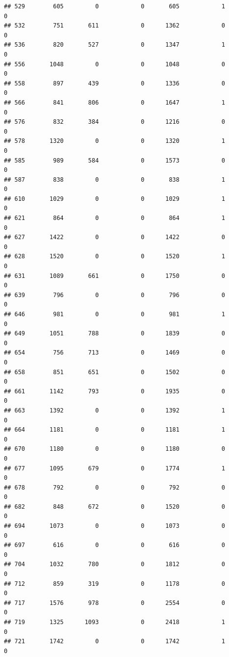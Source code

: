 \documentclass[]{article}
\begin{document}
\begin{verbatim}
## 529        605         0            0       605            1            0
## 532        751       611            0      1362            0            0
## 536        820       527            0      1347            1            0
## 556       1048         0            0      1048            0            0
## 558        897       439            0      1336            0            0
## 566        841       806            0      1647            1            0
## 576        832       384            0      1216            0            0
## 578       1320         0            0      1320            1            0
## 585        989       584            0      1573            0            0
## 587        838         0            0       838            1            0
## 610       1029         0            0      1029            1            0
## 621        864         0            0       864            1            0
## 627       1422         0            0      1422            0            0
## 628       1520         0            0      1520            1            0
## 631       1089       661            0      1750            0            0
## 639        796         0            0       796            0            0
## 646        981         0            0       981            1            0
## 649       1051       788            0      1839            0            0
## 654        756       713            0      1469            0            0
## 658        851       651            0      1502            0            0
## 661       1142       793            0      1935            0            0
## 663       1392         0            0      1392            1            0
## 664       1181         0            0      1181            1            0
## 670       1180         0            0      1180            0            0
## 677       1095       679            0      1774            1            0
## 678        792         0            0       792            0            0
## 682        848       672            0      1520            0            0
## 694       1073         0            0      1073            0            0
## 697        616         0            0       616            0            0
## 704       1032       780            0      1812            0            0
## 712        859       319            0      1178            0            0
## 717       1576       978            0      2554            0            0
## 719       1325      1093            0      2418            1            0
## 721       1742         0            0      1742            1            0

\end{verbatim}
\end{document}
